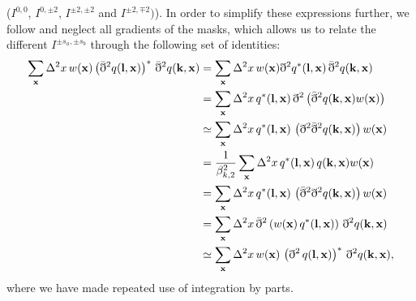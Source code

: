 \documentclass[a4paper,11pt]{article}
\newcommand{\summ}[1]{\sum_{\bf #1}\Delta^2 #1\,}
\begin{document}
      ($I^{0,0}$, $I^{0,\pm2}$, $I^{\pm2,\pm2}$ and $I^{\pm2,\mp2})$). In
      order to simplify these expressions further, we follow \cite{Efstathiou:2006eb,2017A&A...602A..41C} and neglect all gradients of the masks, which allows us to relate the different $I^{\pm s_a,\pm s_b}$ through the following set of identities:
      \begin{align}\nonumber
        \summ{x}w({\bf x})\left(\bar{\eth}^2q({\bf l},{\bf x})\right)^*\,\bar{\eth}^2q({\bf k},{\bf x})
        &=\summ{x}w({\bf x})\eth^2 q^*({\bf l},{\bf x})\,\bar{\eth}^2q({\bf k},{\bf x})\\\nonumber
        &=\summ{x}q^*({\bf l},{\bf x})\,\eth^2\left(\bar{\eth}^2q({\bf k},{\bf x})w({\bf x})\right)\\\nonumber
        &\simeq\summ{x}q^*({\bf l},{\bf x})\,\left(\eth^2\bar{\eth}^2q({\bf k},{\bf x})\right)w({\bf x})\\
        &=\frac{1}{\beta^2_{k,2}}\summ{x}q^*({\bf l},{\bf x})\,q({\bf k},{\bf x})w({\bf x})\\\nonumber
        &=\summ{x}q^*({\bf l},{\bf x})\,\left(\bar{\eth}^2\eth^2q({\bf k},{\bf x})\right)w({\bf x})\\\nonumber
        &=\summ{x}\bar{\eth}^2\left(w({\bf x})\,q^*({\bf l},{\bf x})\right)\,\eth^2q({\bf k},{\bf x})\\
        &\simeq\summ{x}w({\bf x})\,\left(\eth^2\,q({\bf l},{\bf x})\right)^*\,\eth^2q({\bf k},{\bf x}),
      \end{align}
      where we have made repeated use of integration by parts.
    
\end{document}
